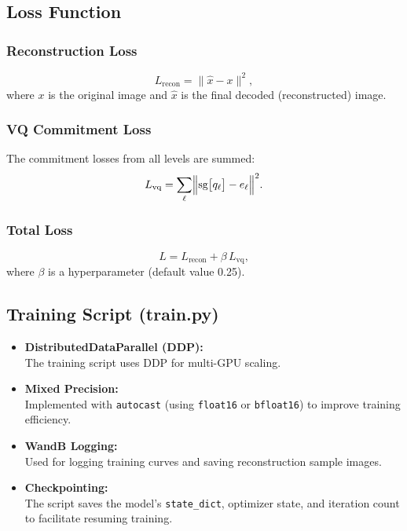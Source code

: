 \documentclass[11pt]{article}
\begin{document}
\subsection{Loss Function}

\subsubsection*{Reconstruction Loss}

\[
L_{\text{recon}} = \|\hat{x} - x\|^2,
\]
where \(x\) is the original image and \(\hat{x}\) is the final decoded (reconstructed) image.

\subsubsection*{VQ Commitment Loss}

The commitment losses from all levels are summed:
\[
L_{\text{vq}} = \sum_{\ell} \Bigl\|\text{sg}\bigl[q_\ell\bigr] - e_\ell\Bigr\|^2.
\]

\subsubsection*{Total Loss}

\[
L = L_{\text{recon}} + \beta\, L_{\text{vq}},
\]
where \(\beta\) is a hyperparameter (default value 0.25).

\subsection{Training Script (train.py)}

\begin{itemize}
  \item \textbf{DistributedDataParallel (DDP):} \\
    The training script uses DDP for multi-GPU scaling.
  \item \textbf{Mixed Precision:} \\
    Implemented with \texttt{autocast} (using \texttt{float16} or \texttt{bfloat16}) to improve training efficiency.
  \item \textbf{WandB Logging:} \\
    Used for logging training curves and saving reconstruction sample images.
  \item \textbf{Checkpointing:} \\
    The script saves the model’s \texttt{state\_dict}, optimizer state, and iteration count to facilitate resuming training.
\end{itemize}
\end{document}
